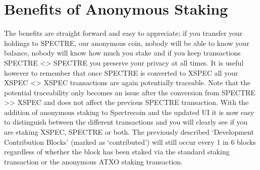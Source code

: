 \section{Benefits of Anonymous Staking}
The benefits are straight forward and easy to appreciate; if you transfer your holdings to SPECTRE, our anonymous coin, nobody will be able to know your balance, nobody will know how much you stake and if you keep transactions SPECTRE <> SPECTRE you preserve your privacy at all times. It is useful however to remember that once SPECTRE is converted to XSPEC all your XSPEC <> XSPEC transactions are again potentially traceable. Note that the potential traceability only becomes an issue after the conversion from SPECTRE >> XSPEC and does not affect the previous SPECTRE transaction. With the addition of anonymous staking to Spectrecoin and the updated UI it is now easy to distinguish between the different transactions and you will clearly see if you are staking XSPEC, SPECTRE or both. The previously described ‘Development Contribution Blocks’ (marked as ‘contributed’) will still occur every 1 in 6 blocks regardless of whether the block has been staked via the standard staking transaction or the anonymous ATXO staking transaction.

